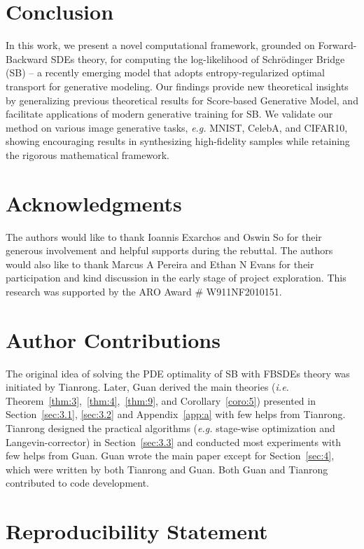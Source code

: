 \documentclass{article}
\newcommand{\eg}{{\ignorespaces\emph{e.g.}}{ }}
\newcommand{\ie}{{\ignorespaces\emph{i.e.}}{ }}
\begin{document}
 

\vspace{-5pt}
\section{Conclusion}
\vspace{-5pt}
In this work, we present a novel computational framework, grounded on Forward-Backward SDEs theory,
for computing the log-likelihood of Schr{\"o}dinger Bridge (SB) --
a recently emerging model that adopts entropy-regularized optimal transport for generative modeling.
Our findings
provide new theoretical insights by generalizing previous theoretical results for Score-based Generative Model,
and facilitate applications of modern generative training for SB.
We validate our method on various image generative tasks, \eg MNIST, CelebA, and CIFAR10,
showing encouraging results in synthesizing high-fidelity samples
while retaining the rigorous mathematical framework.


\newpage

\section*{Acknowledgments}
The authors would like to thank Ioannis Exarchos and Oswin So for their generous involvement and helpful supports during the rebuttal. The authors would also like to thank Marcus A Pereira and Ethan N Evans for their participation and kind discussion in the early stage of project exploration.
This research was supported by the ARO Award \# W911NF2010151.

\section*{Author Contributions} \label{sec:author}
The original idea of solving the PDE optimality of SB with FBSDEs theory was initiated by Tianrong.
Later, Guan derived the main theories (\ie Theorem~\ref{thm:3},~\ref{thm:4},~\ref{thm:9}, and Corollary~\ref{coro:5})
presented in Section~\ref{sec:3.1}, \ref{sec:3.2} and Appendix~\ref{app:a} with few helps from Tianrong.
Tianrong designed the practical algorithms (\eg stage-wise optimization and Langevin-corrector) in Section~\ref{sec:3.3} and
conducted most experiments with few helps from Guan.
Guan wrote the main paper except for Section~\ref{sec:4},
which were written by both Tianrong and Guan.
Both Guan and Tianrong contributed to code development.


\section*{Reproducibility Statement}
\end{document}
